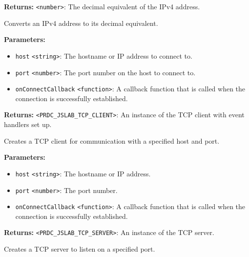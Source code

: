 \documentclass[12pt,a4paper]{article}
\begin{document}
\noindent \textbf{Returns:} \texttt{<number>}: The decimal equivalent of the IPv4 address.

\noindent Converts an IPv4 address to its decimal equivalent.

\vspace{5mm}
\noindent {}


\noindent \textbf{Parameters:}
\begin{itemize}
  \item \texttt{host} \texttt{<string>}: The hostname or IP address to connect to.
  \item \texttt{port} \texttt{<number>}: The port number on the host to connect to.
  \item \texttt{onConnectCallback} \texttt{<function>}: A callback function that is called when the connection is successfully established.
\end{itemize}

\noindent \textbf{Returns:} \texttt{<PRDC\_JSLAB\_TCP\_CLIENT>}: An instance of the TCP client with event handlers set up.

\noindent Creates a TCP client for communication with a specified host and port.

\vspace{5mm}
\noindent {}


\noindent \textbf{Parameters:}
\begin{itemize}
  \item \texttt{host} \texttt{<string>}: The hostname or IP address.
  \item \texttt{port} \texttt{<number>}: The port number.
  \item \texttt{onConnectCallback} \texttt{<function>}: A callback function that is called when the connection is successfully established.
\end{itemize}

\noindent \textbf{Returns:} \texttt{<PRDC\_JSLAB\_TCP\_SERVER>}: An instance of the TCP server.

\noindent Creates a TCP server to listen on a specified port.

\vspace{5mm}
\noindent {}
\end{document}
